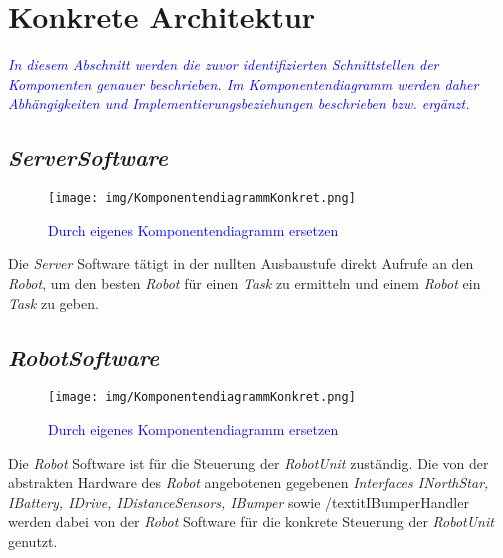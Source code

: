 \section{Konkrete Architektur}
\textcolor{blue}{\textit{In diesem Abschnitt werden die zuvor identifizierten Schnittstellen der Komponenten genauer beschrieben. Im Komponentendiagramm werden daher Abhängigkeiten und Implementierungsbeziehungen beschrieben bzw. ergänzt.
}}
\subsection{\textit{ServerSoftware}}
\begin{figure}[H]
\centering
\texttt{[image: img/KomponentendiagrammKonkret.png]}
\caption{\textcolor{blue}{Durch eigenes Komponentendiagramm ersetzen}}
\label{KomponentendiagrammKonkret}
\end{figure}
Die \textit{Server} Software tätigt in der nullten Ausbaustufe direkt Aufrufe an den \textit{Robot}, 
um den besten \textit{Robot} für einen \textit{Task} zu ermitteln und einem \textit{Robot} ein \textit{Task} zu geben.

\subsection{\textit{RobotSoftware}}
\begin{figure}[H]
	\centering
	\texttt{[image: img/KomponentendiagrammKonkret.png]}
	\caption{\textcolor{blue}{Durch eigenes Komponentendiagramm ersetzen}}
	\label{KomponentendiagrammKonkret}
\end{figure}
Die \textit{Robot} Software ist für die Steuerung der \textit{RobotUnit} zuständig. Die von der abstrakten Hardware 
des \textit{Robot} angebotenen gegebenen \textit{Interfaces INorthStar, IBattery, IDrive, IDistanceSensors, IBumper} sowie 
/textit{IBumperHandler} werden dabei von der \textit{Robot} Software für die konkrete Steuerung der \textit{RobotUnit} genutzt.
